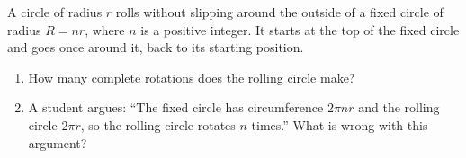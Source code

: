 A circle of radius $r$ rolls without slipping around the outside of a fixed circle of radius $R=nr$, where $n$ is a positive integer. It starts at the top of the fixed circle and goes once around it, back to its starting position.
\begin{enumerate}
\item[(a)] How many complete rotations does the rolling circle make?
\item[(b)] A student argues: ``The fixed circle has circumference $2\pi nr$ and the rolling circle $2\pi r$, so the rolling circle rotates $n$ times.'' What is wrong with this argument?
\end{enumerate}
